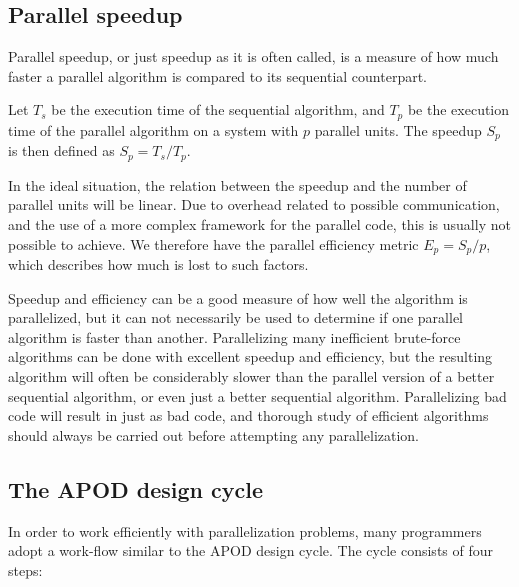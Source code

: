 \subsection{Parallel speedup} %
\label{sub:parallel_speedup}

Parallel speedup, or just speedup as it is often called, is a measure of how much faster a parallel algorithm is compared to its sequential counterpart.

Let $T_s$ be the execution time of the sequential algorithm, and $T_p$ be the execution time of the parallel algorithm on a system with $p$ parallel units. The speedup $S_p$ is then defined as $S_p = T_s / T_p$.

In the ideal situation, the relation between the speedup and the number of parallel units will be linear. Due to overhead related to possible communication, and the use of a more complex framework for the parallel code, this is usually not possible to achieve. We therefore have the parallel efficiency metric $E_p = S_p / p$, which describes how much is lost to such factors.

Speedup and efficiency can be a good measure of how well the algorithm is parallelized, but it can not necessarily be used to determine if one parallel algorithm is faster than another. Parallelizing many inefficient brute-force algorithms can be done with excellent speedup and efficiency, but the resulting algorithm will often be considerably slower than the parallel version of a better sequential algorithm, or even just a better sequential algorithm. Parallelizing bad code will result in just as bad code, and thorough study of efficient algorithms should always be carried out before attempting any parallelization.

\subsection{The APOD design cycle} %
\label{sub:the_apod_design_cycle}

In order to work efficiently with parallelization problems, many programmers adopt a work-flow similar to the APOD design cycle\citep[Assess, Parallelize, Optimize, Deploy]{cuda_c_best_practices_guide}. The cycle consists of four steps:

